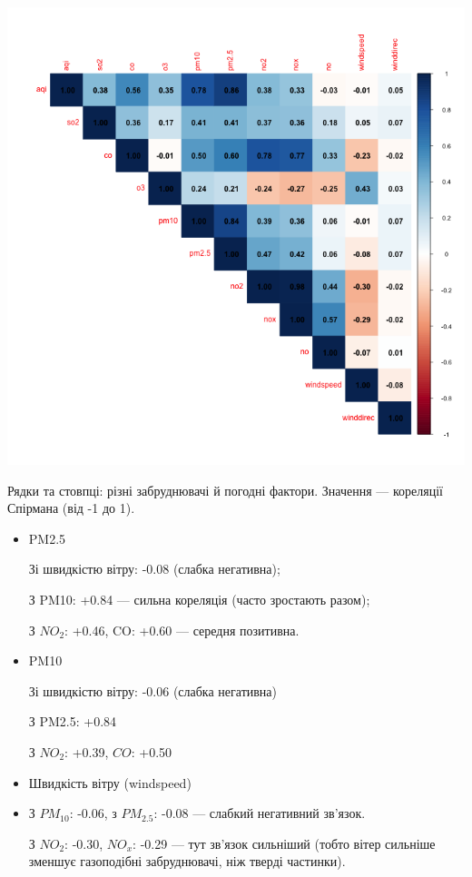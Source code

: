 \documentclass{article}
\begin{document}
\begin{enumerate}
    \includegraphics[width=6in]{plots/question1/corr_matrix_plot.png}

    Рядки та стовпці: різні забруднювачі й погодні фактори. Значення — кореляції Спірмана (від -1 до 1).
    \begin{itemize}
        \item PM2.5

        Зі швидкістю вітру: -0.08 (слабка негативна);

        З PM10: +0.84 — сильна кореляція (часто зростають разом);

        З $NO_2$: +0.46, CO: +0.60 — середня позитивна.
    \item PM10
 
        Зі швидкістю вітру: -0.06 (слабка негативна)

        З PM2.5: +0.84

        З $NO_2$: +0.39, $CO$: +0.50

    \item Швидкість вітру (windspeed)
    \item 
        З $PM_{10}$: -0.06, з $PM_{2.5}$: -0.08 — слабкий негативний зв'язок.

        З $NO_2$: -0.30, $NO_x$: -0.29 — тут зв'язок сильніший (тобто вітер сильніше зменшує газоподібні забруднювачі, ніж тверді частинки).


\end{itemize}
\end{enumerate}
\end{document}
